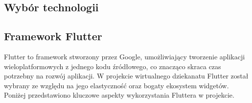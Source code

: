 \subsection{Wybór technologii}

\subsection{Framework Flutter}

Flutter to framework stworzony przez Google, umożliwiający tworzenie aplikacji wieloplatformowych z jednego kodu źródłowego, co znacząco skraca czas potrzebny na rozwój aplikacji. W projekcie wirtualnego dziekanatu Flutter został wybrany ze względu na jego elastyczność oraz bogaty ekosystem widgetów. Poniżej przedstawiono kluczowe aspekty wykorzystania Fluttera w projekcie.

